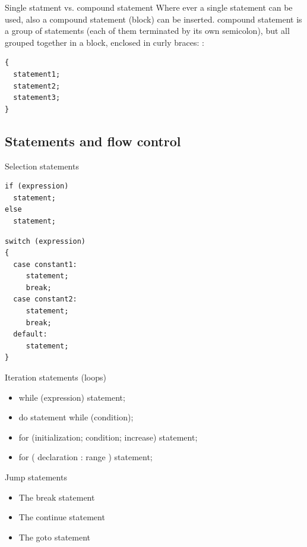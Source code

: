 \documentclass{beamer}
\begin{document}
\begin{frame}[fragile]{Single statment vs. compound statement}
Where ever a single statement can be used, also a compound statement (block) can
be inserted.  compound statement is a group of statements (each of them
terminated by its own semicolon), but all grouped together in a block, enclosed 
in curly braces: {}:
\begin{lstlisting}[caption=Compound statement]
{ 
  statement1; 
  statement2; 
  statement3;
}
\end{lstlisting}
\end{frame}


\subsection{Statements and flow control}
\begin{frame}[fragile]{Selection statements}
\begin{lstlisting}[caption=If and else]
if (expression)
  statement;
else
  statement;
\end{lstlisting}

\begin{lstlisting}[caption=Switch]
switch (expression)
{
  case constant1:
     statement;
     break;
  case constant2:
     statement;
     break;
  default:
     statement;
}
\end{lstlisting}

\end{frame}

\begin{frame}{Iteration statements (loops)}
\begin{itemize}
  \item while (expression) statement;
  \item do statement while (condition);
  \item for (initialization; condition; increase) statement;
  \item for ( declaration : range ) statement;
\end{itemize}
\end{frame}

\begin{frame}{Jump statements}
\begin{itemize}
  \item The break statement
  \item The continue statement
  \item The goto statement
\end{itemize}
\end{frame}
\end{document}

